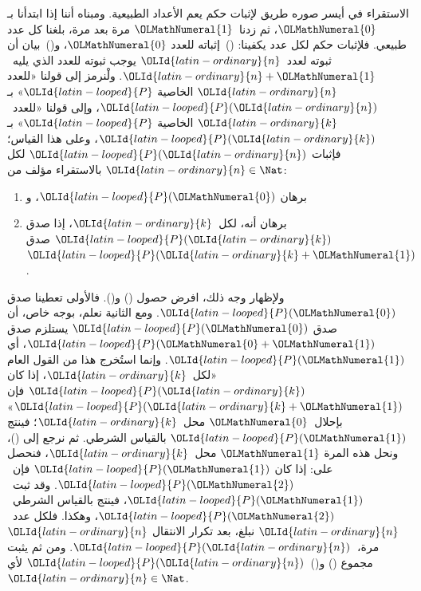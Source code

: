 \documentclass[../../../include/open-logic-section]{subfiles}
\begin{document}


الاستقراء في أيسر صوره طريق لإثبات حكم يعم الأعداد الطبيعية. ومبناه
أننا إذا ابتدأنا بـ$\OLMathNumeral{0}$، ثم زدنا~$\OLMathNumeral{1}$ مرة بعد مرة، بلغنا كل عدد طبيعي.
فلإثبات حكم لكل عدد يكفينا: ()~إثباته للعدد $\OLMathNumeral{0}$، و()~بيان أن ثبوته
لعدد~$\OLId{latin-ordinary}{n}$ يوجب ثبوته للعدد الذي يليه~$\OLId{latin-ordinary}{n}+\OLMathNumeral{1}$. ولْنرمز إلى قولنا «للعدد
$\OLId{latin-ordinary}{n}$ الخاصية $\OLId{latin-looped}{P}$» بـ$\OLId{latin-looped}{P}(\OLId{latin-ordinary}{n})$، وإلى قولنا «للعدد~$\OLId{latin-ordinary}{k}$ الخاصية $\OLId{latin-looped}{P}$»
بـ$\OLId{latin-looped}{P}(\OLId{latin-ordinary}{k})$، وعلى هذا القياس؛ فإثبات $\OLId{latin-looped}{P}(\OLId{latin-ordinary}{n})$ لكل $\OLId{latin-ordinary}{n} \in \Nat$
بالاستقراء مؤلف من:
\begin{enumerate}
\item برهان $\OLId{latin-looped}{P}(\OLMathNumeral{0})$، و
\item برهان أنه، لكل~$\OLId{latin-ordinary}{k}$، إذا صدق $\OLId{latin-looped}{P}(\OLId{latin-ordinary}{k})$ صدق $\OLId{latin-looped}{P}(\OLId{latin-ordinary}{k}+\OLMathNumeral{1})$.
\end{enumerate}
ولإظهار وجه ذلك، افرض حصول () و(). فالأولى تعطينا صدق $\OLId{latin-looped}{P}(\OLMathNumeral{0})$.
ومع الثانية نعلم، بوجه خاص، أن صدق $\OLId{latin-looped}{P}(\OLMathNumeral{0})$ يستلزم صدق $\OLId{latin-looped}{P}(\OLMathNumeral{0}+\OLMathNumeral{1})$، أي
$\OLId{latin-looped}{P}(\OLMathNumeral{1})$. وإنما استُخرج هذا من القول العام «لكل~$\OLId{latin-ordinary}{k}$، إذا كان $\OLId{latin-looped}{P}(\OLId{latin-ordinary}{k})$
فإن $\OLId{latin-looped}{P}(\OLId{latin-ordinary}{k}+\OLMathNumeral{1})$» بإحلال~$\OLMathNumeral{0}$ محل~$\OLId{latin-ordinary}{k}$؛ فينتج $\OLId{latin-looped}{P}(\OLMathNumeral{1})$ بالقياس الشرطي. ثم
نرجع إلى ()، ونحل هذه المرة $\OLMathNumeral{1}$ محل~$\OLId{latin-ordinary}{k}$، فنحصل على: إذا كان
$\OLId{latin-looped}{P}(\OLMathNumeral{1})$ فإن~$\OLId{latin-looped}{P}(\OLMathNumeral{2})$. وقد ثبت~$\OLId{latin-looped}{P}(\OLMathNumeral{1})$، فينتج بالقياس الشرطي~$\OLId{latin-looped}{P}(\OLMathNumeral{2})$،
وهكذا. فلكل عدد~$\OLId{latin-ordinary}{n}$ نبلغ، بعد تكرار الانتقال $\OLId{latin-ordinary}{n}$ مرة،~$\OLId{latin-looped}{P}(\OLId{latin-ordinary}{n})$. ومن ثم
يثبت مجموع () و()~$\OLId{latin-looped}{P}(\OLId{latin-ordinary}{n})$ لأي $\OLId{latin-ordinary}{n} \in \Nat$.
\end{document}
